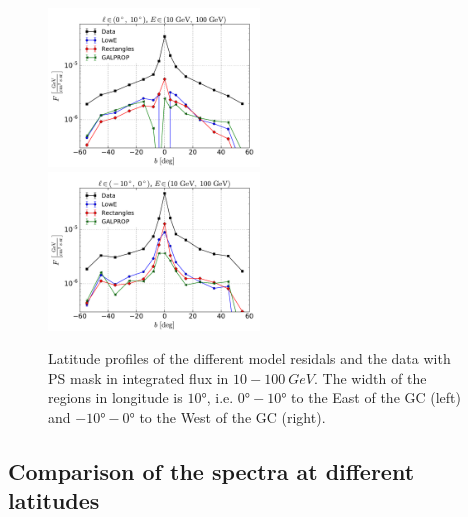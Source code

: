 \begin{figure}[h]
\includegraphics[width=0.5\textwidth]{plots/Profiles_l=1_source_range_1.pdf}
\includegraphics[width=0.5\textwidth]{plots/Profiles_l=0_source_range_1.pdf}
  	\caption{Latitude profiles of the different model residals and the data with PS mask in integrated flux in $10 - \SI{100}{GeV}$. The width of the regions in longitude is $\ang{10}$, i.e. $\ang{0} - \ang{10}$ to the East of the GC (left) and $\ang{-10} - \ang{0}$ to the West of the GC (right).}
  	\label{fig:Profiles}
\end{figure}

\subsection{Comparison of the spectra at different latitudes}

